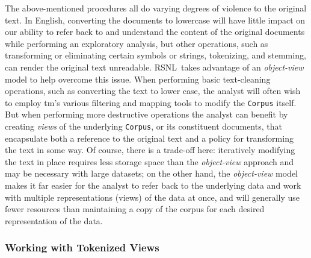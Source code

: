 \documentclass[11pt]{article}
\def\RSNL{{\normalfont\fontseries{b}\selectfont RSNL}}
\def\tm{{\normalfont\fontseries{b}\selectfont tm}}
\let\rclass=\texttt
\begin{document}
The above-mentioned procedures all do varying degrees of violence to
the original text.  In English, converting the documents to lowercase
will have little impact on our ability to refer back to and understand
the content of the original documents while performing an exploratory
analysis, but other operations, such as transforming or eliminating
certain symbols or strings, tokenizing, and stemming, can render the
original text unreadable.  \RSNL\ takes advantage of an
\emph{object-view} model to help overcome this issue.  When performing
basic text-cleaning operations, such as converting the text to lower
case, the analyst will often wish to employ \tm's various filtering
and mapping tools to modify the \rclass{Corpus} itself.  But when
performing more destructive operations the analyst can benefit by
creating \emph{views} of the underlying \rclass{Corpus}, or its
constituent documents, that encapsulate both a reference to the
original text and a policy for transforming the text in some way.  Of
course, there is a trade-off here:  iteratively modifying the text in
place requires less storage space than the \emph{object-view} approach
and may be necessary with large datasets; on the other hand, the
\emph{object-view} model makes it far easier for the analyst to refer
back to the underlying data and work with multiple representations
(views) of the data at once, and will generally use fewer resources
than maintaining a copy of the corpus for each desired representation
of the data.

\subsubsection{Working with Tokenized Views}
\end{document}
